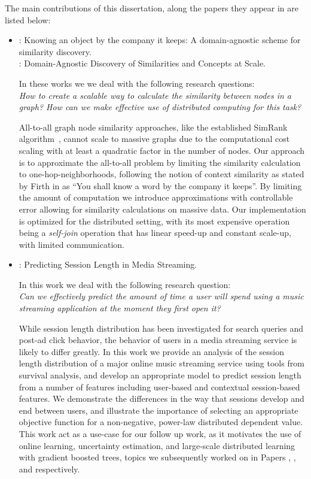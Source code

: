 The main contributions of this dissertation, along the papers they appear in
are listed below:

\begin{itemize}
	\item \textbf{\conceptsicdm}: Knowing an object by the company it keeps: A domain-agnostic scheme
	for similarity discovery. \\
	\textbf{\conceptskais}: Domain-Agnostic Discovery of Similarities and Concepts at Scale.

	In these works we we deal with the following research questions:\\
	\emph{How to create a scalable way to calculate the similarity between nodes
	in a graph? How can we make effective use of distributed computing for this task?
	}

	All-to-all graph node similarity approaches, like the established SimRank algorithm~\cite{simrank},
	cannot scale to massive graphs due to the computational cost scaling with at least a quadratic
	factor in the number of nodes. Our approach is to approximate the all-to-all problem
	by limiting the similarity calculation to one-hop-neighborhoods, following the
	notion of context similarity as stated by Firth in \cite{firth} as ``You shall know
	a word by the company it keeps''. By limiting the amount of computation we introduce
	approximations with controllable error allowing for similarity calculations on massive
	data. Our implementation is optimized for the distributed setting, with its most
	expensive operation being a \emph{self-join} operation that has linear speed-up and
	constant scale-up, with limited communication.

	\item \textbf{\sessionlength}: Predicting Session Length in Media Streaming.

	In this work we deal with the following research question:\\
	\emph{Can we effectively predict the amount of time a user will spend using
	a music streaming application at the moment they first open it?}

	While session length distribution has been investigated for search
	queries and post-ad click behavior, the behavior of users in a media
	streaming service is likely to differ greatly.
	In this work we provide an analysis of the session length distribution
	of a major online music streaming service using tools from survival analysis, and develop an appropriate
	model to predict session length from a number of features including
	user-based and contextual session-based features.
	We demonstrate the differences in the way that sessions develop and end
	between users, and illustrate the importance of selecting an appropriate
	objective function for a non-negative, power-law distributed dependent value.
	This work act as a use-case for our follow up work, as it motivates the use of online learning,
	uncertainty estimation, and large-scale distributed learning with gradient boosted
	trees, topics we subsequently worked on in Papers \boostvhtNum, \uncertaintreesNum,
	and \blockgbtNum respectively.


\end{itemize}
